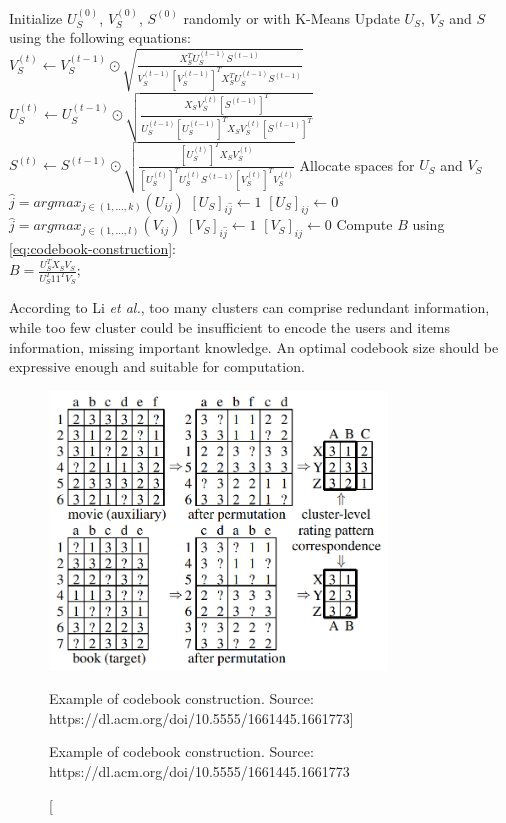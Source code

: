 \begin{algorithm}[H]
Initialize $U_S^{(0)}$, $V_S^{(0)}$, $S^{(0)}$ randomly or with K-Means\;
{
  Update $U_S$, $V_S$ and $S$ using the following equations:\\
  $V_S^{(t)} \gets V_S^{(t - 1)} \odot \sqrt{\frac{X_S^T U_S^{(t - 1)} S^{(t - 1)}}{V_S^{(t - 1)} [V_S^{(t - 1)}]^T X_S^T U_S^{(t - 1)} S^{(t - 1)}}}$\;
  $U_S^{(t)} \gets U_S^{(t - 1)} \odot \sqrt{\frac{X_S V_S^{(t)} [S^{(t - 1)}]^T}{U_S^{(t - 1)} [U_S^{(t - 1)}]^T X_S V_S^{(t)} [S^{(t - 1)}]^T}}$\;
  $S^{(t)} \gets S^{(t - 1)} \odot \sqrt{\frac{[U_S^{(t)}]^T X_S V_S^{(t)}}{[U_S^{(t)}]^T U_S^{(t)} S^{(t - 1)} [V_S^{(t)}]^T V_S^{(t)}}}$\;
}
Allocate spaces for $U_S$ and $V_S$\;
{
  $\hat{j} = argmax_{j \in (1,...,k)}(U_{ij})$\;
  $[U_S]_{i\hat{j}} \gets 1$\;
  {
    $[U_S]_{ij} \gets 0$\;
  }
}
{
  $\hat{j} = argmax_{j \in (1,...,l)}(V_{ij})$\;
  $[V_S]_{i\hat{j}} \gets 1$\;
  {
    $[V_S]_{ij} \gets 0$\;
  }
}
Compute $B$ using \autoref{eq:codebook-construction}:\\
$B = \frac{U_S^T X_S V_S}{U_S^T 11^T V_S}$;
\caption{The algorithm for codebook construction}
\end{algorithm}
\vskip 0.7cm
According to Li \textit{et al.}, too many clusters can comprise redundant information, while too few cluster could be insufficient to encode the users and items information, missing important knowledge. An optimal codebook size should be expressive enough and suitable for computation.
\begin{figure}[hbt]
\centering
\includegraphics[width=0.8\textwidth]{pictures/codebook-construction}
\caption
[Example of codebook construction. Source: https://dl.acm.org/doi/10.5555/1661445.1661773]
{\protect\raggedright Example of codebook construction. Source: https://dl.acm.org/doi/10.5555/1661445.1661773}
\end{figure}


